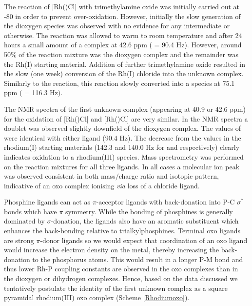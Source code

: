 The reaction of [Rh(\tBuxantphosk)Cl] with trimethylamine oxide was initially carried out at -80 \degC{} in order to prevent over-oxidation.  However, initially the slow generation of the dioxygen species was observed with no evidence for any intermediate or otherwise.  The reaction was allowed to warm to room temperature and after 24 hours a small amount of a complex at 42.6 ppm (\JRhP{} = 90.4 Hz).  However, around 50\%{} of the reaction mixture was the dioxygen complex and the remainder was the Rh(I) starting material.  Addition of further trimethylamine oxide resulted in the slow (one week) conversion of the Rh(I) chloride into the unknown complex.  Similarly to the \tButhixantphos{} reaction, this reaction slowly converted into a species at 75.1 ppm (\JRhP{} = 116.3 Hz).  

The NMR spectra of the first unknown complex (appearing at 40.9 or 42.6 ppm) for the oxidation of [Rh(\tBuxantphosk)Cl] and [Rh(\tButhixantphosk)Cl] are very similar.  In the \phosphorus{} NMR spectra a doublet was observed slightly downfield of the dioxygen complex.  The values of \JRhP{} were identical with either ligand (90.4 Hz).  The decrease from the values in the rhodium(I) starting materials (142.3 and 140.0 Hz for \tBuxantphos{} and \tButhixantphos{} respectively) clearly indicates oxidation to a rhodium(III) species.  Mass spectrometry was performed on the reaction mixtures for all three \tBuxantphos{} ligands.  In all cases a molecular ion peak was observed consistent in both mass$/$charge ratio and isotopic pattern, indicative of an oxo complex ionising \emph{via} loss of a chloride ligand.

Phosphine ligands can act as $\pi$-acceptor ligands with back-donation into P-C $\sigma^*$ bonds which have $\pi$ symmetry.  While the bonding of \tBu{} phosphines is generally dominated by $\sigma$-donation, the \tBuxantphos{} ligands also have an aromatic substituent which enhances the back-bonding relative to trialkylphosphines.  Terminal oxo ligands are strong $\pi$-donor ligands\cite{Betley2008} so we would expect that coordination of an oxo ligand would increase the electron density on the metal, thereby increasing the back-donation to the phosphorus atoms.  This would result in a longer P-M bond and thus lower Rh-P coupling constants are observed in the oxo complexes than in the dioxygen or dihydrogen complexes.  Hence, based on the data discussed we tentatively postulate the identity of the first unknown complex as a square pyramidal rhodium(III) oxo complex (Scheme \ref{Rhodiumoxo}).


